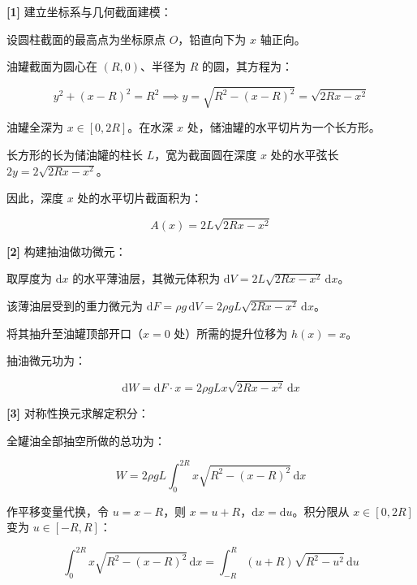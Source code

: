 \documentclass[11pt,a4paper,UTF8]{ctexart}
\begin{document}
\begin{solbox}[分步推导与答题规范]
\textbf{[1]} 建立坐标系与几何截面建模：

设圆柱截面的最高点为坐标原点 $O$，铅直向下为 $x$ 轴正向。

油罐截面为圆心在 $(R, 0)$、半径为 $R$ 的圆，其方程为：


\begin{equation*}
y^2 + (x - R)^2 = R^2 \implies y = \sqrt{R^2 - (x - R)^2} = \sqrt{2Rx - x^2}
\end{equation*}


油罐全深为 $x \in [0, 2R]$。在水深 $x$ 处，储油罐的水平切片为一个长方形。

长方形的长为储油罐的柱长 $L$，宽为截面圆在深度 $x$ 处的水平弦长 $2y = 2\sqrt{2Rx - x^2}$。

因此，深度 $x$ 处的水平切片截面积为：


\begin{equation*}
A(x) = 2L\sqrt{2Rx - x^2}
\end{equation*}


\textbf{[2]} 构建抽油做功微元：

取厚度为 $\mathrm{d}x$ 的水平薄油层，其微元体积为 $\mathrm{d}V = 2L\sqrt{2Rx - x^2}\,\mathrm{d}x$。

该薄油层受到的重力微元为 $\mathrm{d}F = \rho g\,\mathrm{d}V = 2\rho g L\sqrt{2Rx - x^2}\,\mathrm{d}x$。

将其抽升至油罐顶部开口（$x = 0$ 处）所需的提升位移为 $h(x) = x$。

抽油微元功为：


\begin{equation*}
\mathrm{d}W = \mathrm{d}F \cdot x = 2\rho g L x\sqrt{2Rx - x^2}\,\mathrm{d}x
\end{equation*}


\textbf{[3]} 对称性换元求解定积分：

全罐油全部抽空所做的总功为：


\begin{equation*}
W = 2\rho g L \int_0^{2R} x \sqrt{R^2 - (x - R)^2}\,\mathrm{d}x
\end{equation*}


作平移变量代换，令 $u = x - R$，则 $x = u + R$，$\mathrm{d}x = \mathrm{d}u$。积分限从 $x \in [0, 2R]$ 变为 $u \in [-R, R]$：


\begin{equation*}
\int_0^{2R} x \sqrt{R^2 - (x - R)^2}\,\mathrm{d}x = \int_{-R}^R (u + R)\sqrt{R^2 - u^2}\,\mathrm{d}u
\end{equation*}



\end{solbox}
\end{document}
